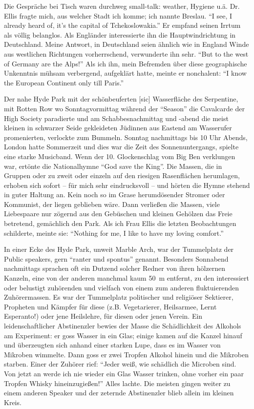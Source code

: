 \documentclass[a5paper,pagesize,10pt,twoside=true]{scrbook}
\begin{document}
Die Gespräche bei Tisch waren durchweg small-talk: weather, Hygiene u.ä. Dr. Ellis fragte mich, aus welcher Stadt ich komme; ich nannte Breslau. \enquote{I see, I already heard of, it's the capital of Tchekoslowakia.} Er empfand seinen Irrtum als völlig belanglos. Als Engländer interessierte ihn die Hauptwindrichtung in Deutschland. Meine Antwort, in Deutschland seien ähnlich wie in England Winde aus westlichen Richtungen vorherrschend, verwunderte ihn sehr. \enquote{But to the west of Germany are the Alps!} Als ich ihn, mein Befremden über diese geographische Unkenntnis mühsam verbergend, aufgeklärt hatte, meinte er nonchalent: \enquote{I know the European Continent only till Paris.}

Der nahe Hyde Park mit der schönbeuferten [sic] Wasserfläche des Serpentine, mit Rotten Row wo Sonntagvormittag während der \enquote{Season} die Cavalcarde der High Society paradierte und am Schabbesnachmittag und -abend die meist kleinen in schwarzer Seide gekleideten Jüdinnen aus Eastend am Wasserufer promenierten, verlockte zum Bummeln. Sonntag nachmittags bis 10 Uhr Abends, London hatte Sommerzeit und dies war die Zeit des Sonnenuntergangs, spielte eine starke Musicband. Wenn der 10. Glockenschlag vom Big Ben verklungen war, ertönte die Nationalhymne \enquote{God save the King}. Die Massen, die in Gruppen oder zu zweit oder einzeln auf den riesigen Rasenflächen herumlagen, erhoben sich sofort -- für mich sehr eindrucksvoll -- und hörten die Hymne stehend in guter Haltung an. Kein noch so im Grase herumdösender Stromer oder Kommunist, der liegen geblieben wäre. Dann verließen die Massen, viele Liebespaare nur zögernd aus den Gebüschen und kleinen Gehölzen das Freie betretend, gemächlich den Park. Als ich Frau Ellis die letzten Beobachtungen schilderte, meinte sie: \enquote{Nothing for me, I like to have my loving comfort.}

In einer Ecke des Hyde Park, unweit Marble Arch, war der Tummelplatz der Public speakers, gern \enquote{ranter und spontus} genannt. Besonders Sonnabend nachmittags sprachen oft ein Dutzend solcher Redner von ihren hölzernen Kanzeln, eine von der anderen manchmal kaum 50~m entfernt, zu den interessiert oder belustigt zuhörenden und vielfach von einem zum anderen fluktuierenden Zuhörermassen. Es war der Tummelplatz politischer und religiöser Sektierer, Propheten und Kämpfer für diese (z.B. Vegetarierer, Heilsarmee, Lernt Esperanto!) oder jene Heilslehre, für diesen oder jenen Verein. Ein leidenschaftlicher Abstinenzler bewies der Masse die Schädlichkeit des Alkohols am Experiment: er goss Wasser in ein Glas; einige kamen auf die Kanzel hinauf und überzeugten sich anhand einer starken Lupe, dass es im Wasser von Mikroben wimmelte. Dann goss er zwei Tropfen Alkohol hinein und die Mikroben starben. Einer der Zuhörer rief: \enquote{Jeder weiß, wie schädlich die Microben sind. Von jetzt an werde ich nie wieder ein Glas Wasser trinken, ohne vorher ein paar Tropfen Whisky hineinzugießen!} Alles lachte. Die meisten gingen weiter zu einem anderen Speaker und der zeternde Abstinenzler blieb allein im kleinen Kreis.
\end{document}
